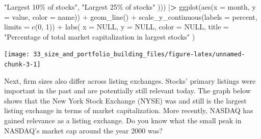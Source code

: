 \documentclass[
]{book}
\newenvironment{Shaded}{\begin{snugshade}}{\end{snugshade}}
\newcommand{\AttributeTok}[1]{\textcolor[rgb]{0.61,0.61,0.61}{#1}}
\newcommand{\ConstantTok}[1]{\textcolor[rgb]{0,0,0}{#1}}
\newcommand{\DecValTok}[1]{\textcolor[rgb]{0.06,0.06,0.06}{#1}}
\newcommand{\ErrorTok}[1]{\textcolor[rgb]{0.14,0.14,0.14}{\textbf{#1}}}
\newcommand{\FunctionTok}[1]{\textcolor[rgb]{0,0,0}{#1}}
\newcommand{\NormalTok}[1]{#1}
\newcommand{\SpecialCharTok}[1]{\textcolor[rgb]{0,0,0}{#1}}
\newcommand{\StringTok}[1]{\textcolor[rgb]{0.5,0.5,0.5}{#1}}
\begin{document}
\begin{Shaded}
\begin{Highlighting}[]
    \StringTok{"Largest 10\% of stocks"}\NormalTok{, }\StringTok{"Largest 25\% of stocks"}
\NormalTok{  ))) }\SpecialCharTok{|}\ErrorTok{\textgreater{}}
  \FunctionTok{ggplot}\NormalTok{(}\FunctionTok{aes}\NormalTok{(}\AttributeTok{x =}\NormalTok{ month, }\AttributeTok{y =}\NormalTok{ value, }\AttributeTok{color =}\NormalTok{ name)) }\SpecialCharTok{+}
  \FunctionTok{geom\_line}\NormalTok{() }\SpecialCharTok{+}
  \FunctionTok{scale\_y\_continuous}\NormalTok{(}\AttributeTok{labels =}\NormalTok{ percent, }\AttributeTok{limits =} \FunctionTok{c}\NormalTok{(}\DecValTok{0}\NormalTok{, }\DecValTok{1}\NormalTok{)) }\SpecialCharTok{+}
  \FunctionTok{labs}\NormalTok{(}
    \AttributeTok{x =} \ConstantTok{NULL}\NormalTok{, }\AttributeTok{y =} \ConstantTok{NULL}\NormalTok{, }\AttributeTok{color =} \ConstantTok{NULL}\NormalTok{,}
    \AttributeTok{title =} \StringTok{"Percentage of total market capitalization in largest stocks"}
\NormalTok{  )}
\end{Highlighting}
\end{Shaded}

\begin{center}\texttt{[image: 33\_size\_and\_portfolio\_building\_files/figure-latex/unnamed-chunk-3-1]} \end{center}

Next, firm sizes also differ across listing exchanges. Stocks' primary listings were important in the past and are potentially still relevant today. The graph below shows that the New York Stock Exchange (NYSE) was and still is the largest listing exchange in terms of market capitalization. More recently, NASDAQ has gained relevance as a listing exchange. Do you know what the small peak in NASDAQ's market cap around the year 2000 was?
\end{document}
